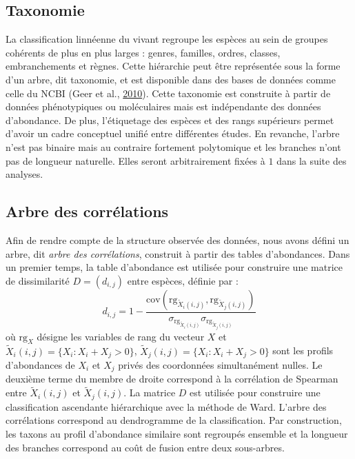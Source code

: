 \documentclass[12pt,a4paper]{reedthesis}
\theoremstyle{definition}
\theoremstyle{definition}
\theoremstyle{definition}
\theoremstyle{remark}
\begin{document}
\hypertarget{taxonomie}{%
\subsection{Taxonomie}\label{taxonomie}}

La classification linnéenne du vivant regroupe les espèces au sein de groupes cohérents de plus en plus larges : genres, familles, ordres, classes, embranchements et règnes. Cette hiérarchie peut être représentée sous la forme d'un arbre, dit taxonomie, et est disponible dans des bases de données comme celle du NCBI (Geer et al., \protect\hyperlink{ref-geer2010ncbi}{2010}). Cette taxonomie est construite à partir de données phénotypiques ou moléculaires mais est indépendante des données d'abondance. De plus, l'étiquetage des espèces et des rangs supérieurs permet d'avoir un cadre conceptuel unifié entre différentes études. En revanche, l'arbre n'est pas binaire mais au contraire fortement polytomique et les branches n'ont pas de longueur naturelle. Elles seront arbitrairement fixées à \(1\) dans la suite des analyses.

\hypertarget{cortree}{%
\subsection{Arbre des corrélations}\label{cortree}}

Afin de rendre compte de la structure observée des données, nous avons défini un arbre, dit \emph{arbre des corrélations}, construit à partir des tables d'abondances. Dans un premier temps, la table d'abondance est utilisée pour construire une matrice de dissimilarité \(D = (d_{i,j})\) entre espèces, définie par :
\begin{equation*}
d_{i,j} = 1 - \frac{\text{cov}(\text{rg}_{\tilde{X}_i(i,j)}, \text{rg}_{\tilde{X}_j(i,j)})}{\sigma_{\text{rg}_{\tilde{X}_i(i,j)}} \sigma_{\text{rg}_{\tilde{X}_j(i,j)}}}
\end{equation*}
où \(\text{rg}_X\) désigne les variables de rang du vecteur \(X\) et \(\tilde{X}_{i}(i,j) = \{X_i: X_i + X_j > 0\}\), \(\tilde{X}_{j}(i,j) = \{X_i: X_i + X_j > 0\}\) sont les profils d'abondances de \(X_i\) et \(X_j\) privés des coordonnées simultanément nulles. Le deuxième terme du membre de droite correspond à la corrélation de Spearman entre \(\tilde{X}_{i}(i,j)\) et \(\tilde{X}_{j}(i,j)\). La matrice \(D\) est utilisée pour construire une classification ascendante hiérarchique avec la méthode de Ward. L'arbre des corrélations correspond au dendrogramme de la classification. Par construction, les taxons au profil d'abondance similaire sont regroupés ensemble et la longueur des branches correspond au coût de fusion entre deux sous-arbres.
\end{document}
